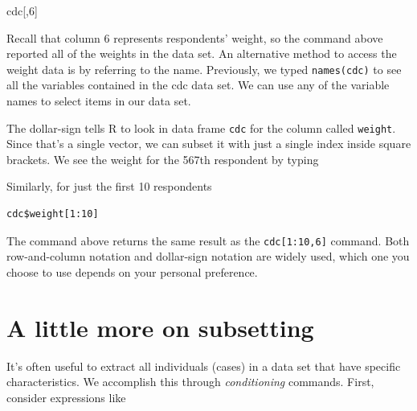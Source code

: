 \documentclass[]{book}
\newenvironment{Shaded}{\begin{snugshade}}{\end{snugshade}}
\newcommand{\DecValTok}[1]{\textcolor[rgb]{0.00,0.00,0.81}{#1}}
\newcommand{\OperatorTok}[1]{\textcolor[rgb]{0.81,0.36,0.00}{\textbf{#1}}}
\newcommand{\NormalTok}[1]{#1}
\theoremstyle{definition}
\theoremstyle{definition}
\theoremstyle{definition}
\theoremstyle{remark}
\begin{document}
\begin{Shaded}
\begin{Highlighting}[]
\NormalTok{cdc[,}\DecValTok{6}\NormalTok{]}
\end{Highlighting}
\end{Shaded}

Recall that column 6 represents respondents' weight, so the command
above reported all of the weights in the data set. An alternative method
to access the weight data is by referring to the name. Previously, we
typed \texttt{names(cdc)} to see all the variables contained in the cdc
data set. We can use any of the variable names to select items in our
data set.

\begin{Shaded}
\end{Shaded}

The dollar-sign tells R to look in data frame \texttt{cdc} for the
column called \texttt{weight}. Since that's a single vector, we can
subset it with just a single index inside square brackets. We see the
weight for the 567th respondent by typing

\begin{Shaded}
\end{Shaded}

Similarly, for just the first 10 respondents

\begin{verbatim}
cdc$weight[1:10]
\end{verbatim}

The command above returns the same result as the
\texttt{cdc{[}1:10,6{]}} command. Both row-and-column notation and
dollar-sign notation are widely used, which one you choose to use
depends on your personal preference.

\section{A little more on subsetting}\label{a-little-more-on-subsetting}

It's often useful to extract all individuals (cases) in a data set that
have specific characteristics. We accomplish this through
\emph{conditioning} commands. First, consider expressions like
\end{document}
